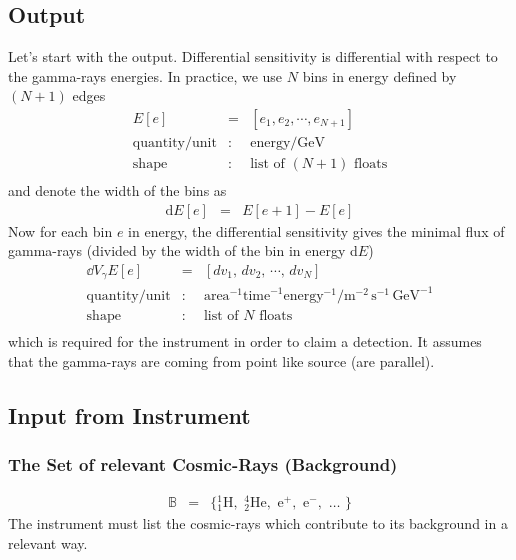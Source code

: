 \documentclass{article}%
\begin{document}
        \subsection{Output}
            Let's start with the output.
            Differential sensitivity is differential with respect to the gamma-rays energies.
            In practice, we use $N$ bins in energy defined by $(N+1)$ edges
            \begin{eqnarray*}
                E[e] &=& [e_1, e_2, \cdots, e_{N+1}]\\
                \text{quantity}/\text{unit} &:& \text{energy} / \text{GeV}\\
                \text{shape} &:& \text{list of}\,\,(N + 1)\,\,\text{floats}\\
            \end{eqnarray*}
            and denote the width of the bins as
            \begin{eqnarray*}
                \text{d}E[e] &=& E[e+1] - E[e]
            \end{eqnarray*}
            Now for each bin $e$ in energy, the differential sensitivity gives the minimal flux of gamma-rays (divided by the width of the bin in energy d$E$)
            \begin{eqnarray*}
                \dd{V_\gamma}{E}[e] &=& [dv_1, \, dv_2, \, \cdots, \, dv_N]\\
                \text{quantity}/\text{unit} &:& \text{area}^{-1} \text{time}^{-1} \text{energy}^{-1} / \text{m}^{-2}\,\text{s}^{-1}\,\text{GeV}^{-1}\\
                \text{shape} &:& \text{list of}\,\,N\,\,\text{floats}\\
            \end{eqnarray*}
            which is required for the instrument in order to claim a detection.
            It assumes that the gamma-rays are coming from point like source (are parallel).
        \subsection{Input from Instrument}
            \subsubsection*{The Set of relevant Cosmic-Rays (Background)}
                \begin{eqnarray*}
                    \mathbb{B} &=& \{
                    {_1^1}\text{H},\,\,
                    {_2^4}\text{He},\,\,
                    \text{e}^{+},\,\,
                    \text{e}^{-},\,\,
                    \dots{}\,\,
                    \}
                \end{eqnarray*}
                The instrument must list the cosmic-rays which contribute to its background in a relevant way.
\end{document}
